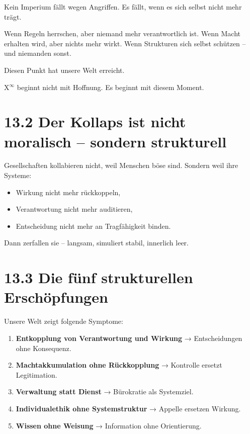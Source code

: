 \documentclass[12pt,a4paper]{book}
\begin{document}
Kein Imperium fällt wegen Angriffen.  
Es fällt, wenn es sich selbst nicht mehr trägt.

Wenn Regeln herrschen, aber niemand mehr verantwortlich ist.  
Wenn Macht erhalten wird, aber nichts mehr wirkt.  
Wenn Strukturen sich selbst schützen – und niemanden sonst.

Diesen Punkt hat unsere Welt erreicht.

X$^\infty$ beginnt nicht mit Hoffnung.  
Es beginnt mit diesem Moment.

\section*{13.2 Der Kollaps ist nicht moralisch – sondern strukturell}

Gesellschaften kollabieren nicht, weil Menschen böse sind.  
Sondern weil ihre Systeme:

\begin{itemize}
    \item Wirkung nicht mehr rückkoppeln,
    \item Verantwortung nicht mehr auditieren,
    \item Entscheidung nicht mehr an Tragfähigkeit binden.
\end{itemize}

Dann zerfallen sie – langsam, simuliert stabil, innerlich leer.

\section*{13.3 Die fünf strukturellen Erschöpfungen}

Unsere Welt zeigt folgende Symptome:

\begin{enumerate}
    \item \textbf{Entkopplung von Verantwortung und Wirkung}  
    → Entscheidungen ohne Konsequenz.

    \item \textbf{Machtakkumulation ohne Rückkopplung}  
    → Kontrolle ersetzt Legitimation.

    \item \textbf{Verwaltung statt Dienst}  
    → Bürokratie als Systemziel.

    \item \textbf{Individualethik ohne Systemstruktur}  
    → Appelle ersetzen Wirkung.

    \item \textbf{Wissen ohne Weisung}  
    → Information ohne Orientierung.
\end{enumerate}
\end{document}

